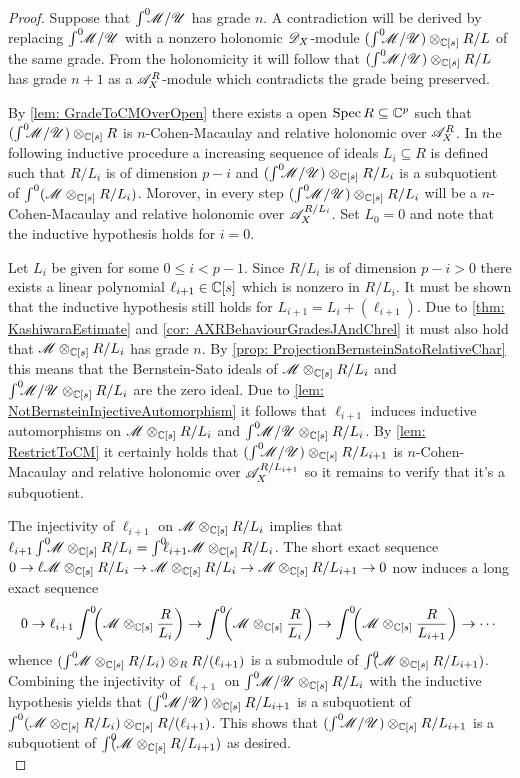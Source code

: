 \begin{proof}
  Suppose that $\int^0 \mkern -8mu\mathscr{M}/\mathscr{U}$ has grade $n$. A contradiction will be derived by replacing $\int^0 \mkern -8mu\mathscr{M}/\mathscr{U}$ with a nonzero holonomic $\mathscr{D}_X$-module $(\int^0 \mkern -8mu\mathscr{M}/\mathscr{U})\otimes_{\mathbb{C}[s]} R/L$ of the same grade. From the holonomicity it will follow that $(\int^0 \mkern -8mu\mathscr{M}/ \mathscr{U})\otimes_{\mathbb{C}[s]} R/L$ has grade $n+1$ as a $\mathscr{A}_X^R$-module which contradicts the grade being preserved.

  By \cref{lem: GradeToCMOverOpen} there exists a open $\operatorname{Spec} R\subseteq \mathbb{C}^p$ such that $(\int^0 \mkern -8mu\mathscr{M}/\mathscr{U})\otimes_{\mathbb{C}[s]}R$ is $n$-Cohen-Macaulay and relative holonomic over $\mathscr{A}_X^R$.
  In the following inductive procedure a increasing sequence of ideals $L_{i}\subseteq R$ is defined such that $R/L_{i}$ is of dimension $p - i$ and $(\int^0 \mkern -8mu\mathscr{M}/\mathscr{U}) \otimes_{\mathbb{C}[s]} R/L_{i}$ is a subquotient of $\int^0(\mathscr{M} \otimes_{\mathbb{C}[s]} R/L_{i})$.
  Morover, in every step $(\int^0 \mkern -8mu\mathscr{M}/\mathscr{U}) \otimes_{\mathbb{C}[s]} R/L_{i}$ will be a $n$-Cohen-Macaulay and relative holonomic over $\mathscr{A}_X^{R/L_{i}}$.
  Set $L_0 = 0$ and note that the inductive hypothesis holds for $i=0$.

  Let $L_i$ be given for some $0\leq i < p-1$. Since $R/L_{i}$ is of dimension $p-i > 0$ there exists a linear polynomial $\ell_{i+1}\in \mathbb{C}[s]$ which is nonzero in $R/L_{i}$.
  It must be shown that the inductive hypothesis still holds for $L_{i+1} = L_i + (\ell_{i+1})$.
  Due to \cref{thm: KashiwaraEstimate} and \cref{cor: AXRBehaviourGradesJAndChrel} it must also hold that $\mathscr{M} \otimes_{\mathbb{C}[s]} R/L_{i}$ has grade $n$.
  By \cref{prop: ProjectionBernsteinSatoRelativeChar} this means that the Bernstein-Sato ideals of $\mathscr{M} \otimes_{\mathbb{C}[s]} R/L_{i}$ and $\int^0 \mkern -8mu\mathscr{M}/\mathscr{U} \otimes_{\mathbb{C}[s]} R/L_{i}$ are the zero ideal.
  Due to \cref{lem: NotBernsteinInjectiveAutomorphism} it follows that $\ell_{i+1}$ induces inductive automorphisms on $\mathscr{M} \otimes_{\mathbb{C}[s]} R/L_{i}$ and $\int^0 \mkern -8mu\mathscr{M}/\mathscr{U} \otimes_{\mathbb{C}[s]} R/L_{i}$.
  By \cref{lem: RestrictToCM} it certainly holds that $(\int^0 \mkern -8mu\mathscr{M}/\mathscr{U}) \otimes_{\mathbb{C}[s]} R/L_{i+1}$ is $n$-Cohen-Macaulay and relative holonomic over $\mathscr{A}_X^{R/L_{i+1}}$ so it remains to verify that it's a subquotient.

  The injectivity of $\ell_{i+1}$ on $\mathscr{M} \otimes_{\mathbb{C}[s]} R/L_{i}$ implies that $\ell_{i+1}\int^0 \mkern -8mu \mathscr{M} \otimes_{\mathbb{C}[s]} R/L_{i} = \int^0 \mkern -8mu \ell_{i+1}\mathscr{M}\otimes_{\mathbb{C}[s]} R/L_{i}$.
  The short exact sequence $0\to \ell\mathscr{M} \otimes_{\mathbb{C}[s]} R/L_{i} \to \mathscr{M} \otimes_{\mathbb{C}[s]} R/L_{i} \to \mathscr{M} \otimes_{\mathbb{C}[s]} R/L_{i+1} \to 0 $ now induces a long exact sequence
  $$0 \to \ell_{i+1}\int^0 \mkern -8mu \left(\mathscr{M} \otimes_{\mathbb{C}[s]} \frac{R}{L_{i}}\right) \to \int^0 \mkern -8mu \left(\mathscr{M} \otimes_{\mathbb{C}[s]} \frac{R}{L_{i}}\right) \to \int^0 \mkern -8mu\left(\mathscr{M} \otimes_{\mathbb{C}[s]} \frac{R}{L_{i+1}}\right) \to \cdots $$
  whence $(\int^0 \mkern -8mu \mathscr{M} \otimes_{\mathbb{C}[s]} R/L_{i})\otimes_{R} R/(\ell_{i+1})$ is a submodule of $\int^0 \mkern -8mu (\mathscr{M} \otimes_{\mathbb{C}[s]} R/L_{i+1})$.
  Combining the injectivity of $\ell_{i+1}$ on $\int^0 \mkern -8mu\mathscr{M}/\mathscr{U} \otimes_{\mathbb{C}[s]} R/L_{i}$ with the inductive hypothesis yields that $(\int^0 \mkern -8mu\mathscr{M}/\mathscr{U}) \otimes_{\mathbb{C}[s]} R/L_{i+1}$ is a subquotient of $\int^0(\mathscr{M} \otimes_{\mathbb{C}[s]} R/L_{i})\otimes_{\mathbb{C}[s]} R/{(\ell_{i+1})}$.
  This shows that $(\int^0 \mkern -8mu\mathscr{M}/\mathscr{U}) \otimes_{\mathbb{C}[s]} R/L_{i+1}$ is a subquotient of $\int^0 \mkern -8mu (\mathscr{M} \otimes_{\mathbb{C}[s]} R/L_{i+1})$ as desired.\\



\end{proof}
